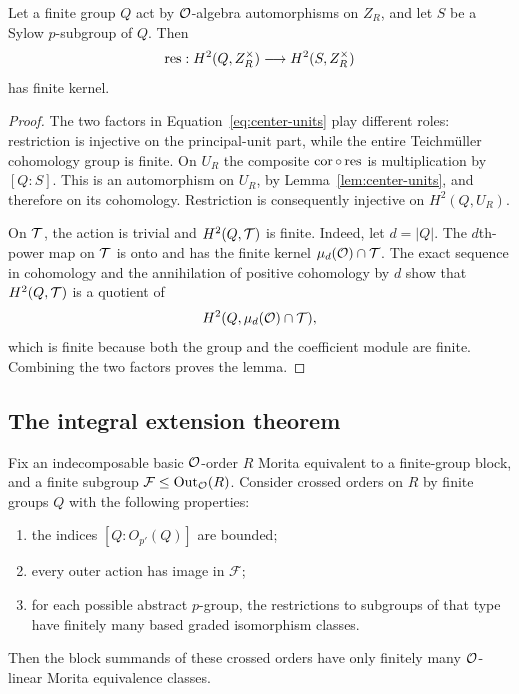 \begin{samepage}
\begin{lemma}
\label{lem:restriction}
Let a finite group $Q$ act by $\mathcal O$-algebra automorphisms on
$Z_R$, and let $S$ be a Sylow $p$-subgroup of $Q$.  Then
\[
 \operatorname{res}:H^2(Q,Z_R^\times)\longrightarrow H^2(S,Z_R^\times)
\]
has finite kernel.
\end{lemma}
\end{samepage}

\begin{proof}
The two factors in Equation~\eqref{eq:center-units} play different
roles: restriction is injective on the principal-unit part, while
the entire Teichm\"uller cohomology group is finite.  On $U_R$ the composite
$\operatorname{cor}\circ\operatorname{res}$ is multiplication by $[Q:S]$.  This is an
automorphism on $U_R$, by Lemma~\ref{lem:center-units}, and
therefore on its cohomology.  Restriction is consequently
injective on $H^2(Q,U_R)$.

On $\mathcal T$, the action is trivial and $H^2(Q,\mathcal T)$ is finite.
Indeed, let $d=|Q|$.  The $d$th-power map on $\mathcal T$ is onto
and has the finite kernel $\mu_d(\mathcal O)\cap\mathcal T$.  The exact
sequence in cohomology and the annihilation of positive
cohomology by $d$ show that $H^2(Q,\mathcal T)$ is a quotient of
\[
 H^2(Q,\mu_d(\mathcal O)\cap\mathcal T),
\]
which is finite because both the group and the coefficient
module are finite.  Combining the two factors proves the lemma.
\end{proof}

\subsection{The integral extension theorem}

\begin{theorem}\label{thm:kernel}
Fix an indecomposable basic $\mathcal O$-order $R$ Morita equivalent
to a finite-group block, and a finite subgroup
$\mathcal F\leq\operatorname{Out}_{\mathcal O}(R)$.  Consider crossed orders on
$R$ by finite groups $Q$ with the following properties:
\begin{enumerate}
\item the indices $[Q:O_{p'}(Q)]$ are bounded;
\item every outer action has image in $\mathcal F$;
\item for each possible abstract $p$-group, the restrictions
to subgroups of that type have finitely many based graded
isomorphism classes.
\end{enumerate}
Then the block summands of these crossed orders have only
finitely many $\mathcal O$-linear Morita equivalence classes.
\end{theorem}

